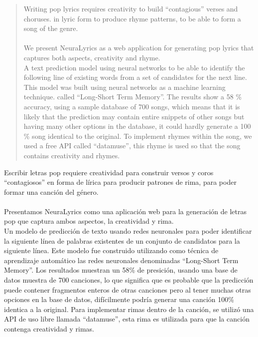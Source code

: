 \begin{abstract}
  Writing pop lyrics requires creativity to build ``contagious'' verses and choruses.
  in lyric form to produce rhyme patterns, to be able to form a song of the genre. \\\\
  We present NeuraLyrics as a web application for generating pop lyrics that captures
  both aspects, creativity and rhyme. \\
  A text prediction model using neural networks to be able to identify the following
  line of existing words from a set of candidates for the next line.
  This model was built using neural networks as a machine learning technique.
  called ``Long-Short Term Memory''. The results show a 58 \% accuracy,
  using a sample database of 700 songs, which means that it is likely
  that the prediction may contain entire snippets of other songs but having
  many other options in the database, it could hardly generate a 100 \% song
  identical to the original. To implement rhymes within the song, we used
  a free API called ``datamuse'', this rhyme is used so that the song
  contains creativity and rhymes.
  \end{abstract}
\vspace{5mm}
  \begin{resumen}
    Escribir letras pop requiere creatividad para construir versos y coros ``contagiosos''
    en forma de lírica para producir patrones de rima, para poder formar una canción del género.\\\\
    Presentamos NeuraLyrics como una aplicación web para la generación de letras pop que captura
    ambos aspectos, la creatividad y rima.\\
    Un modelo de predicción de texto usando redes neuronales para poder identificar la siguiente
    línea de palabras existentes de un conjunto de candidatos para la siguiente línea.
    Este modelo fue construido utilizando como técnica de aprendizaje automático las redes neuronales
    denominadas ``Long-Short Term Memory''. Los resultados muestran un 58\% de presición,
    usando una base de datos muestra de 700 canciones, lo que significa que es probable
    que la predicción puede contener fragmentos enteros de otras canciones pero al tener
    muchas otras opciones en la base de datos, difícilmente podría generar una canción 100\%
    identica a la original. Para implementar rimas dentro de la canción, se utilizó
    una API de uso libre llamada ``datamuse'', esta rima es utilizada para que la canción
    contenga creatividad y rimas.\\\\
  \end{resumen}

